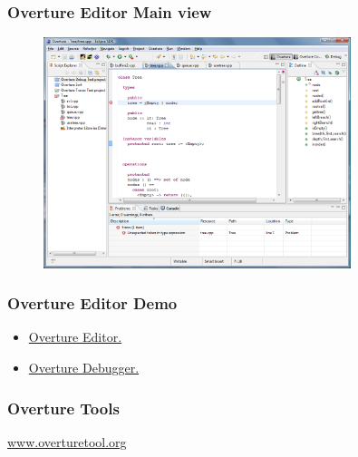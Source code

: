 \frame
{
  \frametitle{Overture Editor Main view}

\begin{figure}[t]
\centering
\includegraphics[width=0.8\textwidth]{images/EditorOverview}
\label{fig:}
\end{figure}
}

\frame
{
  \frametitle{Overture Editor Demo}

  \begin{itemize}
  \item<1-> \href{http://mt.lausdahl.com/downloads/ScreenCasts/CreateProjectWithOutline/}{Overture Editor.}
  \item<2-> \href{http://mt.lausdahl.com/downloads/ScreenCasts/DemoOvertureDebugger/}{Overture Debugger.}     

  \end{itemize}
}


\frame
{
  \frametitle{Overture Tools}

\begin{center}
\href{www.overturetool.org}{www.overturetool.org}
\end{center}

}



